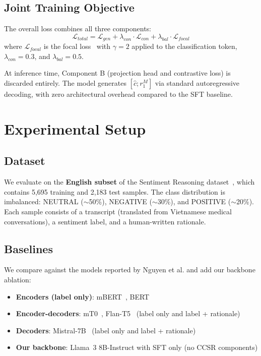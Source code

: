 \documentclass[conference]{IEEEtran}
\begin{document}
\subsection{Joint Training Objective}

The overall loss combines all three components:
\begin{equation}
    \mathcal{L}_{total} = \mathcal{L}_{gen} + \lambda_{con} \cdot \mathcal{L}_{con} + \lambda_{bal} \cdot \mathcal{L}_{focal}
    \label{eq:total_loss}
\end{equation}
where $\mathcal{L}_{focal}$ is the focal loss~\cite{ross2017focal} with $\gamma = 2$ applied to the classification token, $\lambda_{con} = 0.3$, and $\lambda_{bal} = 0.5$.

At inference time, Component B (projection head and contrastive loss) is discarded entirely. The model generates $[\hat{c}; r_1^M]$ via standard autoregressive decoding, with zero architectural overhead compared to the SFT baseline.

\section{Experimental Setup}

\subsection{Dataset}

We evaluate on the \textbf{English subset} of the Sentiment Reasoning dataset~\cite{nguyen2024sentiment}, which contains 5,695 training and 2,183 test samples. The class distribution is imbalanced: NEUTRAL ($\sim$50\%), NEGATIVE ($\sim$30\%), and POSITIVE ($\sim$20\%). Each sample consists of a transcript (translated from Vietnamese medical conversations), a sentiment label, and a human-written rationale.

\subsection{Baselines}

We compare against the models reported by Nguyen et al. and add our backbone ablation:

\begin{itemize}
    \item \textbf{Encoders (label only)}: mBERT~\cite{devlin2018bert}, BERT~\cite{devlin2018bert}
    \item \textbf{Encoder-decoders}: mT0~\cite{muennighoff2022crosslingual}, Flan-T5~\cite{chung2022scaling} (label only and label + rationale)
    \item \textbf{Decoders}: Mistral-7B~\cite{jiang2023mistral} (label only and label + rationale)
    \item \textbf{Our backbone}: Llama~3 8B-Instruct with SFT only (no CCSR components)
\end{itemize}
\end{document}
